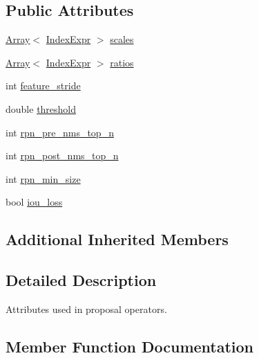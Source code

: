 \subsection*{Public Attributes}
\begin{DoxyCompactItemize}
\item 
\hyperlink{classtvm_1_1Array}{Array}$<$ \hyperlink{namespacetvm_1_1relay_ae153a27d81399fd266b8d598227764c4}{Index\+Expr} $>$ \hyperlink{structtvm_1_1relay_1_1ProposalAttrs_a0fbb2676833987768b1062753e2df1a3}{scales}
\item 
\hyperlink{classtvm_1_1Array}{Array}$<$ \hyperlink{namespacetvm_1_1relay_ae153a27d81399fd266b8d598227764c4}{Index\+Expr} $>$ \hyperlink{structtvm_1_1relay_1_1ProposalAttrs_ad209fd15e12d634ae07ac05b63d54850}{ratios}
\item 
int \hyperlink{structtvm_1_1relay_1_1ProposalAttrs_a7d64e565f89cc66c40253d7fe3c74fad}{feature\+\_\+stride}
\item 
double \hyperlink{structtvm_1_1relay_1_1ProposalAttrs_ae8473a10238c2e4f21875b7e40cbdc10}{threshold}
\item 
int \hyperlink{structtvm_1_1relay_1_1ProposalAttrs_a87c3a6d7d2e0225ebbab9353bc60af25}{rpn\+\_\+pre\+\_\+nms\+\_\+top\+\_\+n}
\item 
int \hyperlink{structtvm_1_1relay_1_1ProposalAttrs_afbd367be5eda478b817075e70cc6edbc}{rpn\+\_\+post\+\_\+nms\+\_\+top\+\_\+n}
\item 
int \hyperlink{structtvm_1_1relay_1_1ProposalAttrs_abee4a0809679e2a5a4f00e07e9650b5e}{rpn\+\_\+min\+\_\+size}
\item 
bool \hyperlink{structtvm_1_1relay_1_1ProposalAttrs_a0f8dbb0dfdc411a67254588e4ccf0f65}{iou\+\_\+loss}
\end{DoxyCompactItemize}
\subsection*{Additional Inherited Members}


\subsection{Detailed Description}
Attributes used in proposal operators. 

\subsection{Member Function Documentation}
